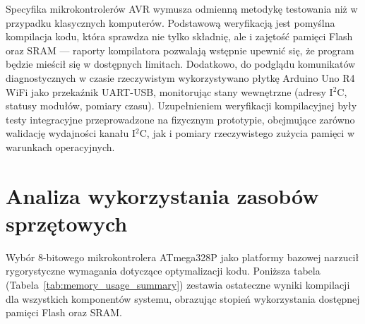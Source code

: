 \documentclass{SGGW-thesis}
\begin{document}
Specyfika mikrokontrolerów AVR wymusza odmienną metodykę testowania niż w przypadku klasycznych komputerów. Podstawową weryfikacją jest pomyślna kompilacja kodu, która sprawdza nie tylko składnię, ale i zajętość pamięci Flash oraz SRAM — raporty kompilatora pozwalają wstępnie upewnić się, że program będzie mieścił się w dostępnych limitach. Dodatkowo, do podglądu komunikatów diagnostycznych w czasie rzeczywistym wykorzystywano płytkę Arduino Uno R4 WiFi jako przekaźnik UART-USB, monitorując stany wewnętrzne (adresy I$^2$C, statusy modułów, pomiary czasu). Uzupełnieniem weryfikacji kompilacyjnej były testy integracyjne przeprowadzone na fizycznym prototypie, obejmujące zarówno walidację wydajności kanału I$^2$C, jak i pomiary rzeczywistego zużycia pamięci w warunkach operacyjnych.

\section{Analiza wykorzystania zasobów sprzętowych}
Wybór 8-bitowego mikrokontrolera ATmega328P jako platformy bazowej narzucił rygorystyczne wymagania dotyczące optymalizacji kodu. Poniższa tabela (Tabela~\ref{tab:memory_usage_summary}) zestawia ostateczne wyniki kompilacji dla wszystkich komponentów systemu, obrazując stopień wykorzystania dostępnej pamięci Flash oraz SRAM.
\end{document}
